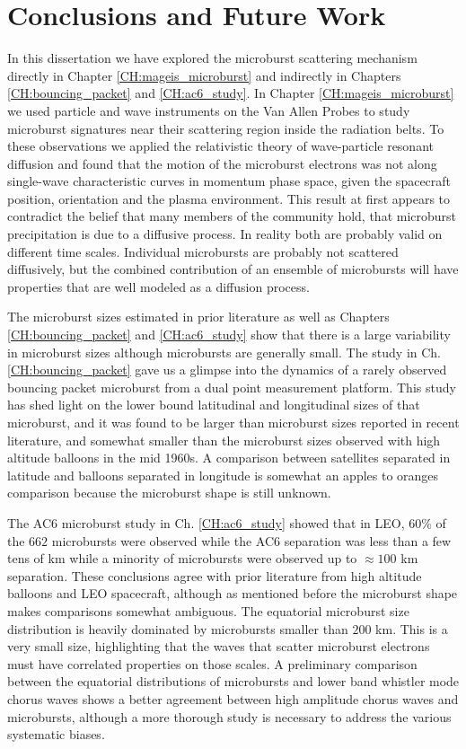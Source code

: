 \chapter{Conclusions and Future Work}\label{conclusions}
In this dissertation we have explored the microburst scattering mechanism directly in Chapter \ref{CH:mageis_microburst} and indirectly in Chapters \ref{CH:bouncing_packet} and \ref{CH:ac6_study}. In Chapter \ref{CH:mageis_microburst} we used particle and wave instruments on the Van Allen Probes to study microburst signatures near their scattering region inside the radiation belts. To these observations we applied the relativistic theory of wave-particle resonant diffusion and found that the motion of the microburst electrons was not along single-wave characteristic curves in momentum phase space, given the spacecraft position, orientation and the plasma environment. This result at first appears to contradict the belief that many members of the community hold, that microburst precipitation is due to a diffusive process. In reality both are probably valid on different time scales. Individual microbursts are probably not scattered diffusively, but the combined contribution of an ensemble of microbursts will have properties that are well modeled as a diffusion process.

The microburst sizes estimated in prior literature as well as Chapters \ref{CH:bouncing_packet} and \ref{CH:ac6_study} show that there is a large variability in microburst sizes although microbursts are generally small. The study in Ch. \ref{CH:bouncing_packet} gave us a glimpse into the dynamics of a rarely observed bouncing packet microburst from a dual point measurement platform. This study has shed light on the lower bound latitudinal and longitudinal sizes of that microburst, and it was found to be larger than microburst sizes reported in recent literature, and somewhat smaller than the microburst sizes observed with high altitude balloons in the mid 1960s. A comparison between satellites separated in latitude and balloons separated in longitude is somewhat an apples to oranges comparison because the microburst shape is still unknown.

The AC6 microburst study in Ch. \ref{CH:ac6_study} showed that in LEO, $60 \%$ of the $662$ microbursts were observed while the AC6 separation was less than a few tens of km while a minority of microbursts were observed up to $\approx 100$ km separation. These conclusions agree with prior literature from high altitude balloons and LEO spacecraft, although as mentioned before the microburst shape makes comparisons somewhat ambiguous. The equatorial microburst size distribution is heavily dominated by microbursts smaller than $200$ km. This is a very small size, highlighting that the waves that scatter microburst electrons must have correlated properties on those scales. A preliminary comparison between the equatorial distributions of microbursts and lower band whistler mode chorus waves shows a better agreement between high amplitude chorus waves and microbursts, although a more thorough study is necessary to address the various systematic biases.


